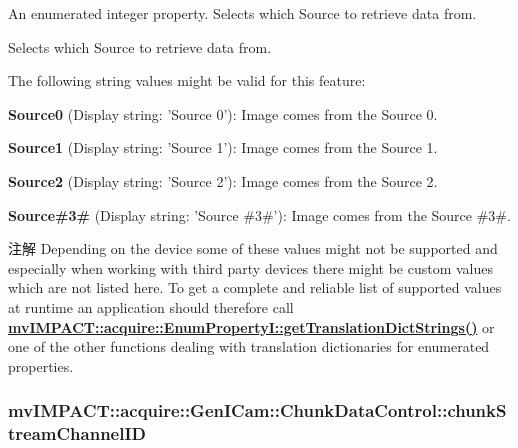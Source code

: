 An enumerated integer property. Selects which Source to retrieve data from. 

Selects which Source to retrieve data from.

The following string values might be valid for this feature\+:
\begin{DoxyItemize}
\item {\bfseries Source0} (Display string\+: 'Source 0')\+: Image comes from the Source 0.
\item {\bfseries Source1} (Display string\+: 'Source 1')\+: Image comes from the Source 1.
\item {\bfseries Source2} (Display string\+: 'Source 2')\+: Image comes from the Source 2.
\item {\bfseries Source\#3\#} (Display string\+: 'Source \#3\#')\+: Image comes from the Source \#3\#.
\end{DoxyItemize}

\begin{DoxyNote}{注解}
Depending on the device some of these values might not be supported and especially when working with third party devices there might be custom values which are not listed here. To get a complete and reliable list of supported values at runtime an application should therefore call {\bfseries \hyperlink{classmv_i_m_p_a_c_t_1_1acquire_1_1_enum_property_i_a0ba6ccbf5ee69784d5d0b537924d26b6}{mv\+I\+M\+P\+A\+C\+T\+::acquire\+::\+Enum\+Property\+I\+::get\+Translation\+Dict\+Strings()}} or one of the other functions dealing with translation dictionaries for enumerated properties. 
\end{DoxyNote}
\hypertarget{classmv_i_m_p_a_c_t_1_1acquire_1_1_gen_i_cam_1_1_chunk_data_control_af31e8f39ddba15bdeb3c2199abbd3f32}{
\subsubsection[{chunk\+Stream\+Channel\+I\+D}]{ mv\+I\+M\+P\+A\+C\+T\+::acquire\+::\+Gen\+I\+Cam\+::\+Chunk\+Data\+Control\+::chunk\+Stream\+Channel\+I\+D}}\label{classmv_i_m_p_a_c_t_1_1acquire_1_1_gen_i_cam_1_1_chunk_data_control_af31e8f39ddba15bdeb3c2199abbd3f32}


